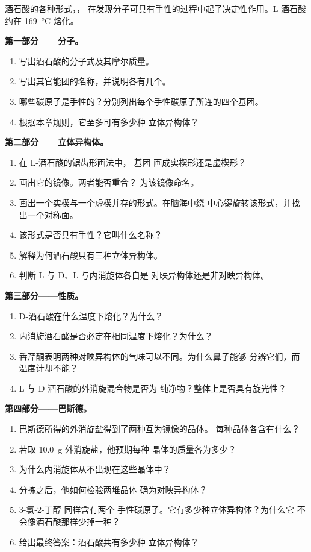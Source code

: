 \begin{problem}
\label{pb:g12:stereochemistry:1}
酒石酸的各种形式，，
在发现分子可具有手性的过程中起了决定性作用。L-酒石酸约在 \qty{169}{\celsius} 熔化。

\medskip
\noindent\textbf{第一部分——分子。}
\begin{enumerate}
  \item 写出酒石酸的分子式及其摩尔质量。
  \item 写出其官能团的名称，并说明各有几个。
  \item 哪些碳原子是手性的？分别列出每个手性碳原子所连的四个基团。
  \item 根据本章规则，它至多可有多少种
        立体异构体？
\end{enumerate}

\medskip
\noindent\textbf{第二部分——立体异构体。}
\begin{enumerate}[resume]
  \item 在 L-酒石酸的锯齿形画法中， 基团
        画成实楔形还是虚楔形？
  \item 画出它的镜像。两者能否重合？
        为该镜像命名。
  \item 画出一个实楔与一个虚楔并存的形式。在脑海中绕
        中心键旋转该形式，并找出一个对称面。
  \item 该形式是否具有手性？它叫什么名称？
  \item 解释为何酒石酸只有三种立体异构体。
  \item 判断 L 与 D、L 与内消旋体各自是
        对映异构体还是非对映异构体。
\end{enumerate}

\medskip
\noindent\textbf{第三部分——性质。}
\begin{enumerate}[resume]
  \item D-酒石酸在什么温度下熔化？为什么？
  \item 内消旋酒石酸是否必定在相同温度下熔化？为什么？
  \item 香芹酮表明两种对映异构体的气味可以不同。为什么鼻子能够
        分辨它们，而温度计却不能？
  \item L 与 D 酒石酸的外消旋混合物是否为
        纯净物？整体上是否具有旋光性？
\end{enumerate}

\medskip
\noindent\textbf{第四部分——巴斯德。}
\begin{enumerate}[resume]
  \item 巴斯德所得的外消旋盐得到了两种互为镜像的晶体。
        每种晶体各含有什么？
  \item 若取 \qty{10.0}{g} 外消旋盐，他预期每种
        晶体的质量各为多少？
  \item 为什么内消旋体从不出现在这些晶体中？
  \item 分拣之后，他如何检验两堆晶体
        确为对映异构体？
  \item 3-氯-2-丁醇  同样含有两个
        手性碳原子。它有多少种立体异构体？为什么它
        不会像酒石酸那样少掉一种？
  \item 给出最终答案：酒石酸共有多少种
        立体异构体？
\end{enumerate}
\end{problem}
